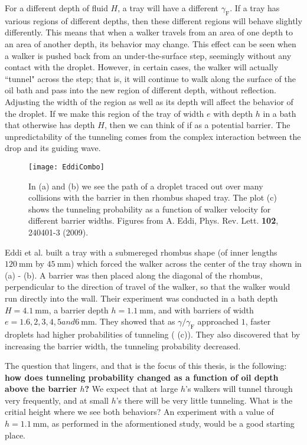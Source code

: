 For a different depth of fluid $H$, a tray will have a different $\gamma_\mathrm{F}$. If a tray has various regions of different depths, then these different regions will behave slightly differently. This means that when a walker travels from an area of one depth to an area of another depth, its behavior may change. This effect can be seen when a walker is pushed back from an under-the-surface step, seemingly without any contact with the droplet. However, in certain cases, the walker will actually ``tunnel" across the step; that is, it will continue to walk along the surface of the oil bath and pass into the new region of different depth, without reflection. Adjusting the width of the region as well as its depth will affect the behavior of the droplet. If we make this region of the tray of width $e$ with depth $h$ in a bath that otherwise has depth $H$, then we can think of if as a potential barrier. The unpredictability of the tunneling comes from the complex interaction between the drop and its guiding wave. 

\begin{figure}[h!]
  \texttt{[image: EddiCombo]}
\caption{In (a) and (b) we see the path of a droplet traced out over many collisions with the barrier in then rhombus shaped tray. The plot (c) shows the tunneling probability as a function of walker velocity for different barrier widths. Figures from A. Eddi, Phys. Rev. Lett. \textbf{102}, 240401-3 (2009).}
\label{fig:Eddi}
	\end{figure}

Eddi et al. built a tray with a submereged rhombus shape (of inner lengths $120~\mathrm{mm}$ by $45~\mathrm{mm}$) which forced the walker across the center of the tray shown in  (a) - (b). A barrier was then placed along the diagonal of the rhombus, perpendicular to the direction of travel of the walker, so that the walker would run directly into the wall. Their experiment was conducted in a bath depth $H = 4.1~\mathrm{mm}$, a barrier depth $h = 1.1~\mathrm{mm}$, and with barriers of width $e = 1.6, 2, 3, 4, 5 and 6~\mathrm{mm}$. They showed that as $\gamma/\gamma_\mathrm{F}$ approached $1$, faster droplets had higher probabilities of tunneling ( (c)). They also discovered that by increasing the barrier width, the tunneling probability decreased. 

The question that lingers, and that is the focus of this thesis, is the following: \textbf{how does tunneling probability changed as a function of oil depth above the barrier $h$?} We expect that at large $h$'s walkers will tunnel through very frequently, and at small $h$'s there will be very little tunneling. What is the critial height where we see both behaviors? An experiment with a value of $h = 1.1~\mathrm{mm}$, as performed in the aformentioned study, would be a good starting place. 
